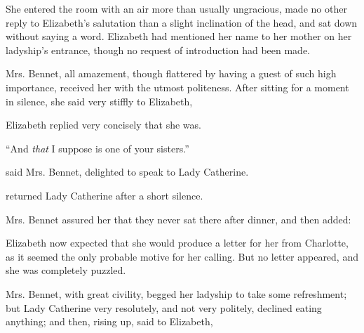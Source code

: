 She entered the room with an air more than usually ungracious, made no other reply to Elizabeth's salutation than a slight inclination of the head, and sat down without saying a word. Elizabeth had mentioned her name to her mother on her ladyship's entrance, though no request of introduction had been made.

Mrs. Bennet, all amazement, though flattered by having a guest of such high importance, received her with the utmost politeness. After sitting for a moment in silence, she said very stiffly to Elizabeth,


Elizabeth replied very concisely that she was.

“And {\em that} I suppose is one of your sisters.”

 said Mrs. Bennet, delighted to speak to Lady Catherine. 

 returned Lady Catherine after a short silence.



Mrs. Bennet assured her that they never sat there after dinner, and then added:



Elizabeth now expected that she would produce a letter for her from Charlotte, as it seemed the only probable motive for her calling. But no letter appeared, and she was completely puzzled.

Mrs. Bennet, with great civility, begged her ladyship to take some refreshment; but Lady Catherine very resolutely, and not very politely, declined eating anything; and then, rising up, said to Elizabeth,


